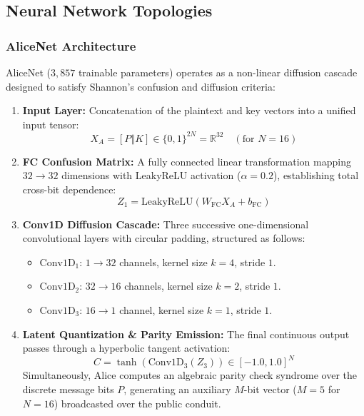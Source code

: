 \documentclass[journal,10pt,twocolumn]{IEEEtran}
\begin{document}
\subsection{Neural Network Topologies}

\subsubsection{AliceNet Architecture}
AliceNet ($3,857$ trainable parameters) operates as a non-linear diffusion cascade designed to satisfy Shannon's confusion and diffusion criteria:
\begin{enumerate}
    \item \textbf{Input Layer:} Concatenation of the plaintext and key vectors into a unified input tensor:
    \begin{equation}
        X_A = [P \mathbin{\Vert} K] \in \{0, 1\}^{2N} = \mathbb{R}^{32} \quad (\text{for } N=16)
    \end{equation}
    \item \textbf{FC Confusion Matrix:} A fully connected linear transformation mapping $32 \to 32$ dimensions with LeakyReLU activation ($\alpha = 0.2$), establishing total cross-bit dependence:
    \begin{equation}
        Z_1 = \text{LeakyReLU}(W_{\text{FC}} X_A + b_{\text{FC}})
    \end{equation}
    \item \textbf{Conv1D Diffusion Cascade:} Three successive one-dimensional convolutional layers with circular padding, structured as follows:
    \begin{itemize}
        \item $\text{Conv1D}_1$: $1 \to 32$ channels, kernel size $k=4$, stride $1$.
        \item $\text{Conv1D}_2$: $32 \to 16$ channels, kernel size $k=2$, stride $1$.
        \item $\text{Conv1D}_3$: $16 \to 1$ channel, kernel size $k=1$, stride $1$.
    \end{itemize}
    \item \textbf{Latent Quantization & Parity Emission:} The final continuous output passes through a hyperbolic tangent activation:
    \begin{equation}
        C = \tanh(\text{Conv1D}_3(Z_3)) \in [-1.0, 1.0]^N
    \end{equation}
    Simultaneously, Alice computes an algebraic parity check syndrome over the discrete message bits $P$, generating an auxiliary $M$-bit vector ($M=5$ for $N=16$) broadcasted over the public conduit.
\end{enumerate}
\end{document}
